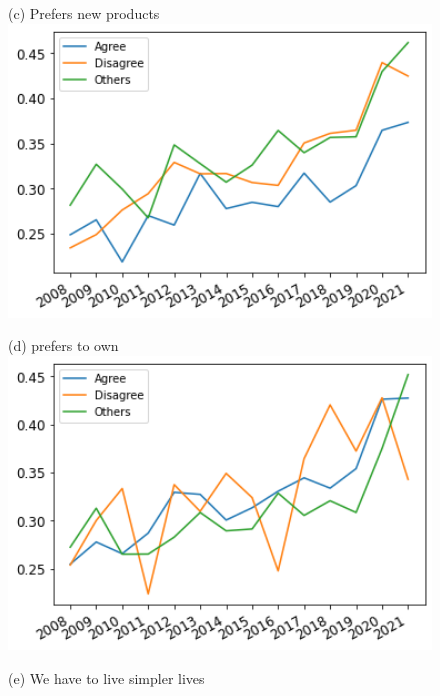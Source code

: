 \documentclass[12pt]{article}
\begin{document}
\begin{figure}[h!!]
	\begin{minipage}[h!!]{0.32\textwidth}
	\centering\footnotesize{(c) Prefers new products}
	\includegraphics[width=1\textwidth]{../codding_data/results/liss/broad_groups_notnecessaryqk20a148_ci306.png}
\end{minipage}
	\begin{minipage}[h!!]{0.32\textwidth}
	\centering\footnotesize{(d) prefers to own}
	\includegraphics[width=1\textwidth]{../codding_data/results/liss/broad_groups_notnecessaryqk20a144_ci306.png}
\end{minipage}
\begin{minipage}[h!!]{0.32\textwidth}
\centering\footnotesize{(e) We have to live simpler lives}

\end{minipage}
\end{figure}
\end{document}
